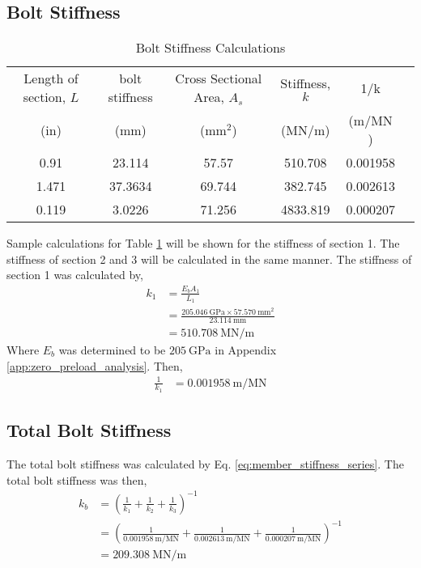 \subsection{Bolt Stiffness}
\begin{table}[h]
    \centering
    \caption{Bolt Stiffness Calculations}
    \label{tab:bolt_stiffness}
    \begin{tabular}{cccccc}
    \toprule
    Length of section, $L$	& bolt stiffness	& Cross Sectional Area, $A_s$	& Stiffness, $k$	& 1/k \\
    (in)	& (mm)	& (mm$^2$)	& ($\unit{\mega\newton\per\meter}$)	& ($\unit{\meter\per\mega\newton}$) \\
    \midrule
    0.91	& 23.114	& 57.57 & 510.708 & 0.001958 \\
    1.471	& 37.3634	& 69.744 & 382.745 & 0.002613 \\
    0.119	& 3.0226	& 71.256 & 4833.819 & 0.000207 \\
    \bottomrule
    \end{tabular}
\end{table}
Sample calculations for Table \ref{tab:bolt_stiffness} will be shown for the stiffness of section 1. The stiffness of section 2 and 3 will be calculated in the same manner. The stiffness of section 1 was calculated by,
\begin{align*}
    k_1 &= \frac{E_b A_1}{L_1} \\
    &= \frac{\qty{205.046}{\giga\pascal} \times \qty{57.570}{\milli\meter\squared}}{\qty{23.114}{\milli\meter}} \\
    &= \qty{510.708}{\mega\newton\per\meter}
\end{align*}
Where $E_b$ was determined to be $\qty{205}{\giga\pascal}$ in Appendix \ref{app:zero_preload_analysis}. Then,
\begin{align*}
    \frac{1}{k_1} &= \qty{0.001958}{\meter\per\mega\newton}
\end{align*}

\subsection{Total Bolt Stiffness}
The total bolt stiffness was calculated by Eq. \ref{eq:member_stiffness_series}. The total bolt stiffness was then,
\begin{align*}
    k_b &= \left(\frac{1}{k_1} + \frac{1}{k_2} + \frac{1}{k_3}\right)^{-1} \\
    &= \left(\frac{1}{\qty{0.001958}{\meter\per\mega\newton}} + \frac{1}{\qty{0.002613}{\meter\per\mega\newton}} + \frac{1}{\qty{0.000207}{\meter\per\mega\newton}}\right)^{-1} \\
    &= \boxed{\qty{209.308}{\mega\newton\per\meter}}
\end{align*}